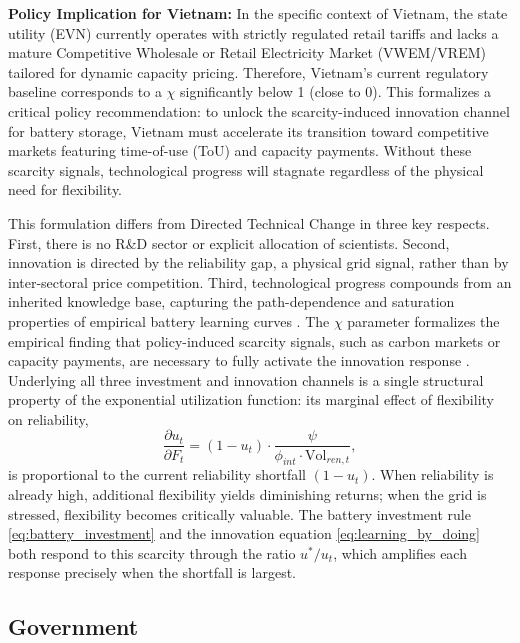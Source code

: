 \documentclass[12pt, a4paper]{article}
\begin{document}
	\textbf{Policy Implication for Vietnam:} In the specific context of Vietnam, the state utility (EVN) currently operates with strictly regulated retail tariffs and lacks a mature Competitive Wholesale or Retail Electricity Market (VWEM/VREM) tailored for dynamic capacity pricing. Therefore, Vietnam's current regulatory baseline corresponds to a $\chi$ significantly below 1 (close to 0). This formalizes a critical policy recommendation: to unlock the scarcity-induced innovation channel for battery storage, Vietnam must accelerate its transition toward competitive markets featuring time-of-use (ToU) and capacity payments. Without these scarcity signals, technological progress will stagnate regardless of the physical need for flexibility.
	
	This formulation differs from Directed Technical Change in three key respects. First, there is no R\&D sector or explicit allocation of scientists. Second, innovation is directed by the reliability gap, a physical grid signal, rather than by inter-sectoral price competition. Third, technological progress compounds from an inherited knowledge base, capturing the path-dependence and saturation properties of empirical battery learning curves \citep{kittner2017, way2022}. The $\chi$ parameter formalizes the empirical finding that policy-induced scarcity signals, such as carbon markets or capacity payments, are necessary to fully activate the innovation response \citep{calel2016, aghion2016}. Underlying all three investment and innovation channels is a single structural property of the exponential utilization function: its marginal effect of flexibility on reliability,
	\begin{equation}
		\frac{\partial u_t}{\partial F_t} = (1 - u_t) \cdot \frac{\psi}{\phi_{int} \cdot \text{Vol}_{ren,t}},
	\end{equation}
	is proportional to the current reliability shortfall $(1-u_t)$. When reliability is already high, additional flexibility yields diminishing returns; when the grid is stressed, flexibility becomes critically valuable. The battery investment rule \eqref{eq:battery_investment} and the innovation equation \eqref{eq:learning_by_doing} both respond to this scarcity through the ratio $u^*/u_t$, which amplifies each response precisely when the shortfall is largest.
	
	
	\subsection{Government} \label{sec:government}
	
\end{document}
